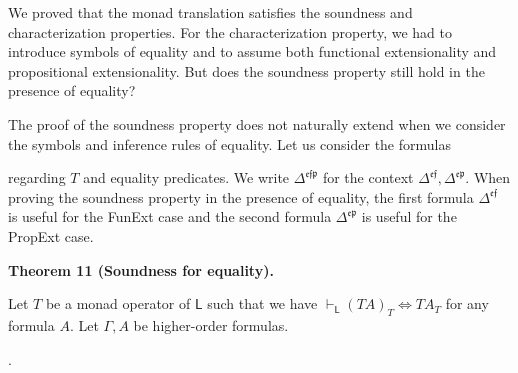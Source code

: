 We proved that the monad translation satisfies the soundness and characterization properties. For the characterization property, we had to introduce symbols of equality and to assume both functional extensionality and propositional extensionality. But does the soundness property still hold in the presence of equality?\par
 
 
 
The proof of the soundness property does not naturally extend when we consider the symbols and inference rules of equality. Let us consider the formulas\par
 
\begin{center}\end{center}
 
regarding $T$ and equality predicates. We write $\Delta^{\mathfrak{e}\mathfrak{f}\mathfrak{p}}$ for the context $\Delta^{\mathfrak{e}\mathfrak{f}},\Delta^{\mathfrak{e}\mathfrak{p}}$. When proving the soundness property in the presence of equality, the first formula $\Delta^{\mathfrak{e}\mathfrak{f}}$ is useful for the FunExt case and the second formula $\Delta^{\mathfrak{e}\mathfrak{p}}$ is useful for the PropExt case.\par
 
 
 
\par\medskip\noindent\textbf{Theorem 11 (Soundness for equality).}\par
 
 
Let $T$ be a monad operator of $\mathsf{L}$ such that we have $\vdash_{\mathsf{L}}(TA)_{T}\Leftrightarrow TA_{T}$ for any formula $A$. Let $\Gamma,A$ be higher-order formulas.\par
  
\par{}. 
 
